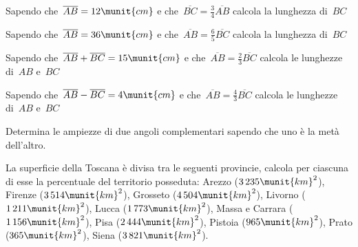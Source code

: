 \begin{htmulticols}{2}
 \begin{esercizio}
\label{ese:3.99}
Sapendo che~\(\overline{AB}=12\munit{cm}\) e che~\(\overline{BC}=\frac{3}{4}
\overline{AB}\) calcola la lunghezza di~\(BC\)
\end{esercizio}

\begin{esercizio}
\label{ese:3.100}
Sapendo che~\(\overline{AB}=36\munit{cm}\) e che~\(\overline{AB}=\frac{6}{5}
\overline{BC}\) calcola la lunghezza di~\(BC\)
\end{esercizio}

\begin{esercizio}
\label{ese:3.101}
Sapendo che~\(\overline{AB}+\overline{BC}=15\munit{cm}\) e 
che~\(\overline{AB}=
\frac{2}{3}\overline{BC}\) calcola le lunghezze di~\(AB\) e~\(BC\)
\end{esercizio}

\begin{esercizio}
\label{ese:3.102}
Sapendo che~\(\overline{AB}-\overline{BC}=4\munit{cm}\) e che~\(\overline{AB}=
\frac{4}{3}\overline{BC}\) calcola le lunghezze di~\(AB\) e~\(BC\)
\end{esercizio}

\begin{esercizio}
\label{ese:3.103}
Determina le ampiezze di due angoli complementari sapendo che uno è la metà 
dell'altro.
\end{esercizio}

% 

\begin{esercizio}
\label{ese:3.106}
La superficie della Toscana è divisa tra le seguenti provincie, calcola per 
ciascuna di esse la percentuale del territorio posseduta: 
Arezzo (\(3\,235\munit{km}^2\)), Firenze (\(3\,514\munit{km}^2\)),
Grosseto (\(4\,504\munit{km}^2\)), Livorno (\(1\,211\munit{km}^2\)), 
Lucca (\(1\,773\munit{km}^2\)), Massa e Carrara (\(1\,156\munit{km}^2\)), 
Pisa (\(2\,444\munit{km}^2\)), Pistoia (\(965\munit{km}^2\)),
Prato (\(365\munit{km}^2\)), Siena (\(3\,821\munit{km}^2\)).
\end{esercizio}


\end{htmulticols}
